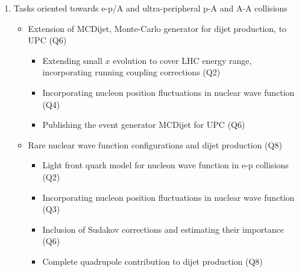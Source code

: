         \begin{enumerate}
            \item Tasks oriented towards e-p/A and  
				ultra-peripheral p-A and A-A collisions   
                \begin{itemize}
                    \item Extension of MCDijet,  Monte-Carlo generator 
						for dijet production, to UPC (Q6)
                        \begin{itemize}
                            \item Extending small $x$ evolution to cover 
								LHC energy range, incorporating running
								coupling corrections  (Q2)
                            \item Incorporating nucleon position fluctuations 
								in nuclear wave function (Q4)
                            \item Publishing the event generator MCDijet for UPC  (Q6)
                        \end{itemize}
                    \item Rare nuclear wave function configurations 
						and dijet production 
						(Q8)
                        \begin{itemize}
							\item Light front quark model for 
							nucleon wave function in e-p collisions (Q2) 
                            \item Incorporating nucleon position fluctuations 
								in nuclear wave function   (Q3)
                            \item Inclusion of Sudakov corrections and
								estimating their importance  (Q6)
                            \item   
								Complete quadrupole contribution to dijet production  (Q8)
                        \end{itemize}
                \end{itemize}
        \end{enumerate}
